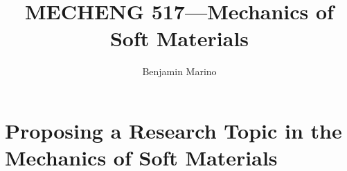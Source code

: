 \documentclass[preprint,12pt,authoryear]{elsarticle}
\begin{document}
\begin{frontmatter}

\title{MECHENG 517---Mechanics of Soft Materials} %

\author{Benjamin Marino} 




            \end{frontmatter}


\section*{Proposing a Research Topic in the Mechanics of Soft Materials}



\normalsize

\newpage



% 









 


\end{document}
